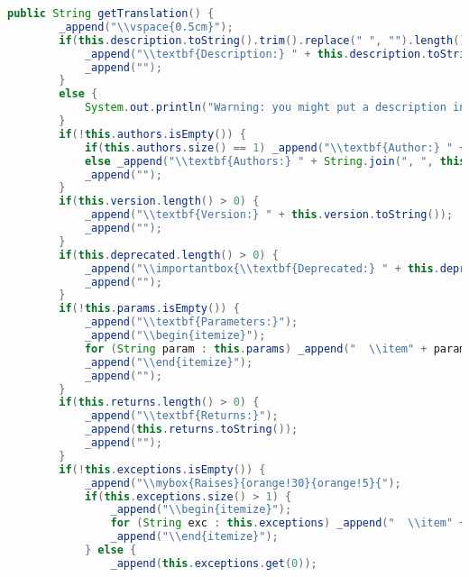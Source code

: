 \begin{lstlisting}[language=Java]
    public String getTranslation() {
        _append("\\vspace{0.5cm}");
        if(this.description.toString().trim().replace(" ", "").length() > 0) {
            _append("\\textbf{Description:} " + this.description.toString());
            _append("");
        }
        else {
            System.out.println("Warning: you might put a description in your javadoc sections.");
        }
        if(!this.authors.isEmpty()) {
            if(this.authors.size() == 1) _append("\\textbf{Author:} " + this.authors.get(0));
            else _append("\\textbf{Authors:} " + String.join(", ", this.authors));
            _append("");
        }
        if(this.version.length() > 0) {
            _append("\\textbf{Version:} " + this.version.toString());
            _append("");
        }
        if(this.deprecated.length() > 0) {
            _append("\\importantbox{\\textbf{Deprecated:} " + this.deprecated.toString() + "}");
            _append("");
        }
        if(!this.params.isEmpty()) {
            _append("\\textbf{Parameters:}");
            _append("\\begin{itemize}");
            for (String param : this.params) _append("  \\item" + param);
            _append("\\end{itemize}");
            _append("");
        }
        if(this.returns.length() > 0) {
            _append("\\textbf{Returns:}");
            _append(this.returns.toString());
            _append("");
        }
        if(!this.exceptions.isEmpty()) {
            _append("\\mybox{Raises}{orange!30}{orange!5}{");
            if(this.exceptions.size() > 1) {
                _append("\\begin{itemize}");
                for (String exc : this.exceptions) _append("  \\item" + exc);
                _append("\\end{itemize}");
            } else {
                _append(this.exceptions.get(0));

\end{lstlisting}
